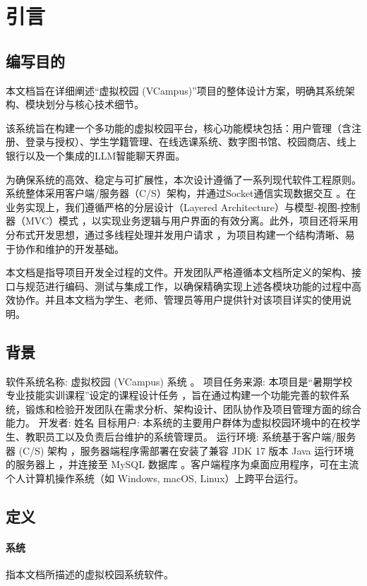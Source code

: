 \ifx\maindoc\undefined
{}
\fi

\section{引言}

\subsection{编写目的}
本文档旨在详细阐述“虚拟校园 (VCampus)”项目的整体设计方案，明确其系统架构、模块划分与核心技术细节。

该系统旨在构建一个多功能的虚拟校园平台，核心功能模块包括：用户管理（含注册、登录与授权）、学生学籍管理、在线选课系统、数字图书馆、校园商店、线上银行以及一个集成的LLM智能聊天界面。

为确保系统的高效、稳定与可扩展性，本次设计遵循了一系列现代软件工程原则。系统整体采用客户端/服务器（C/S）架构，并通过Socket通信实现数据交互 。在业务实现上，我们遵循严格的分层设计（Layered Architecture）与模型-视图-控制器（MVC）模式 ，以实现业务逻辑与用户界面的有效分离。此外，项目还将采用分布式开发思想，通过多线程处理并发用户请求 ，为项目构建一个结构清晰、易于协作和维护的开发基础。

本文档是指导项目开发全过程的文件。开发团队严格遵循本文档所定义的架构、接口与规范进行编码、测试与集成工作，以确保精确实现上述各模块功能的过程中高效协作。并且本文档为学生、老师、管理员等用户提供针对该项目详实的使用说明。

\subsection{背景}
软件系统名称: 虚拟校园 (VCampus) 系统 。
项目任务来源: 本项目是“暑期学校专业技能实训课程”设定的课程设计任务 ，旨在通过构建一个功能完善的软件系统，锻炼和检验开发团队在需求分析、架构设计、团队协作及项目管理方面的综合能力。
开发者: 姓名
目标用户: 本系统的主要用户群体为虚拟校园环境中的在校学生、教职员工以及负责后台维护的系统管理员。
运行环境: 系统基于客户端/服务器 (C/S) 架构 ，服务器端程序需部署在安装了兼容 JDK 17 版本 Java 运行环境的服务器上 ，并连接至 MySQL 数据库 。客户端程序为桌面应用程序，可在主流个人计算机操作系统（如 Windows, macOS, Linux）上跨平台运行。

\subsection{定义}
\paragraph{系统}指本文档所描述的虚拟校园系统软件。
